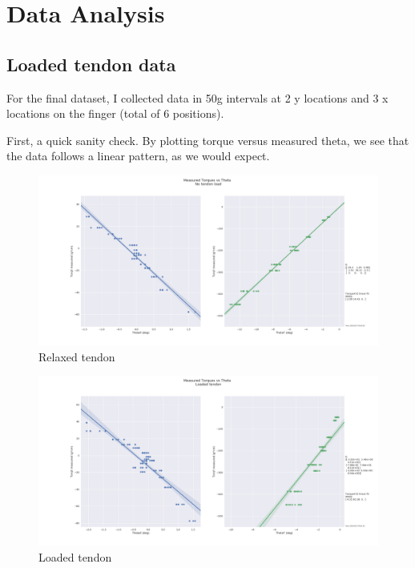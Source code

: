\documentclass[12pt]{article}
\begin{document}

\section{Data Analysis}\label{sec:analisedosdados}

\subsection{Loaded tendon data}

For the final dataset, I collected data in 50g intervals at 2 y locations and 3 x locations on the
finger (total of 6 positions). 

First, a quick sanity check. By plotting torque versus measured theta, we see that the data follows
a linear pattern, as we would expect.

\begin{figure}[H]
\centering
\includegraphics[width=.9\textwidth]{images/stiff/GOODtorqtheta.png}
\caption{Relaxed tendon}
\end{figure}


\begin{figure}[H]
\centering
\includegraphics[width=.9\textwidth]{images/stiff/GOODtorqtheta_loaded.png}
\caption{Loaded tendon}
\end{figure}
\end{document}
